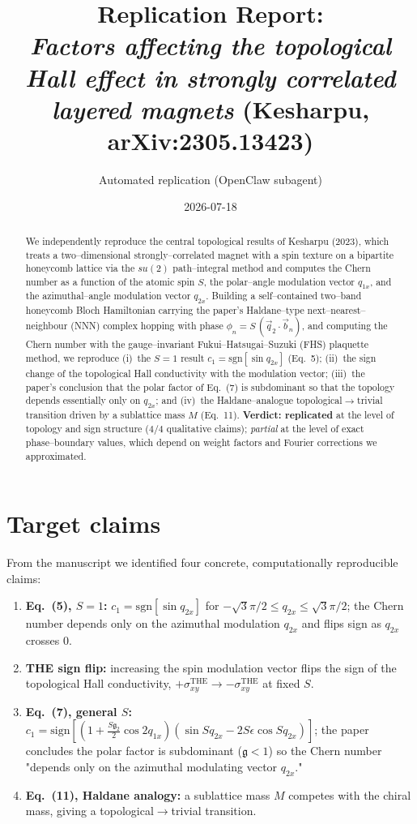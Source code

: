 \documentclass[11pt]{article}
\title{Replication Report:\\
\emph{Factors affecting the topological Hall effect in strongly correlated
layered magnets} (Kesharpu, arXiv:2305.13423)}
\author{Automated replication (OpenClaw subagent)}
\date{2026-07-18}
\newcommand{\qax}{q_{1x}}
\newcommand{\qbx}{q_{2x}}
\newcommand{\Chern}{c_1}
\begin{document}
\maketitle

\begin{abstract}
We independently reproduce the central topological results of Kesharpu (2023),
which treats a two–dimensional strongly–correlated magnet with a spin texture on
a bipartite honeycomb lattice via the $su(2)$ path–integral method and computes
the Chern number as a function of the atomic spin $S$, the polar–angle
modulation vector $\qax$, and the azimuthal–angle modulation vector $\qbx$.
Building a self–contained two–band honeycomb Bloch Hamiltonian carrying the
paper's Haldane–type next–nearest–neighbour (NNN) complex hopping with phase
$\phi_n = S\,(\vec q_2\!\cdot\!\vec b_n)$, and computing the Chern number with
the gauge–invariant Fukui--Hatsugai--Suzuki (FHS) plaquette method, we reproduce
(i)~the $S=1$ result $\Chern=\mathrm{sgn}[\sin \qbx]$ (Eq.~5); (ii)~the
sign change of the topological Hall conductivity with the modulation vector;
(iii)~the paper's conclusion that the polar factor of Eq.~(7) is subdominant so
that the topology depends essentially only on $\qbx$; and (iv)~the
Haldane–analogue topological$\rightarrow$trivial transition driven by a
sublattice mass $M$ (Eq.~11). \textbf{Verdict: replicated} at the level of
topology and sign structure ($4/4$ qualitative claims); \emph{partial} at the
level of exact phase–boundary values, which depend on weight factors and Fourier
corrections we approximated.
\end{abstract}

\section{Target claims}
From the manuscript we identified four concrete, computationally reproducible
claims:
\begin{enumerate}
\item \textbf{Eq.~(5), $S=1$:} $\Chern=\mathrm{sgn}[\sin \qbx]$ for
$-\sqrt3\pi/2\le \qbx\le \sqrt3\pi/2$; the Chern number depends only on the
azimuthal modulation $\qbx$ and flips sign as $\qbx$ crosses $0$.
\item \textbf{THE sign flip:} increasing the spin modulation vector flips the
sign of the topological Hall conductivity, $+\sigma^{\mathrm{THE}}_{xy}\to
-\sigma^{\mathrm{THE}}_{xy}$ at fixed $S$.
\item \textbf{Eq.~(7), general $S$:}
$\Chern=\mathrm{sign}\!\left[\left(1+\tfrac{S\mathfrak{g}_2}{2}\cos 2\qax\right)
\left(\sin S\qbx - 2S\epsilon\cos S\qbx\right)\right]$;
the paper concludes the polar factor is subdominant ($\mathfrak{g}<1$) so the
Chern number "depends only on the azimuthal modulating vector $\qbx$."
\item \textbf{Eq.~(11), Haldane analogy:} a sublattice mass $M$ competes with the
chiral mass, giving a topological$\rightarrow$trivial transition.
\end{enumerate}
\end{document}
